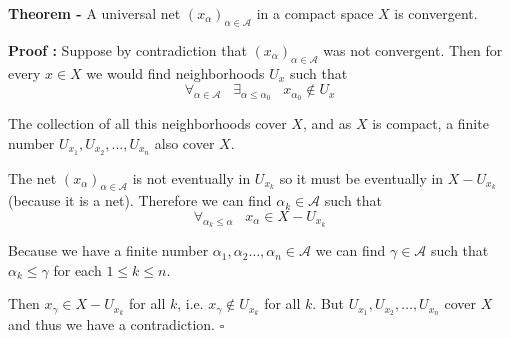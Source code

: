 \documentclass[12pt]{article}
\begin{document}
{\bf Theorem -} A universal net $ (x_{\alpha})_{\alpha \in \mathcal{A}}$ in a compact space $ X$ is convergent.

{\bf Proof :} Suppose by contradiction that $(x_{\alpha})_{\alpha \in \mathcal{A}}$ was not convergent. Then for every $x \in X$ we would find neighborhoods $U_x$ such that
\[
\forall_{\alpha \in \mathcal{A}}\;\;\; \exists_{\alpha \leq \alpha_0} \;\;\; x_{\alpha_0} \notin U_x
\]

The collection of all this neighborhoods cover $X$, and as $X$ is compact, a finite number
$U_{x_1}, U_{x_2}, \dots, U_{x_n}$ also cover $X$.

The net $(x_{\alpha})_{\alpha \in \mathcal{A}}$ is not eventually in $U_{x_k}$ so it must be eventually in $X-U_{x_k}$ (because it is a  net). Therefore we can find $\alpha_k \in \mathcal{A}$ such that
\[ \forall_{\alpha_k \leq \alpha} \;\;\; x_{\alpha} \in X-U_{x_k} \]

Because we have a finite number $\alpha_1, \alpha_2 \dots, \alpha_n \in \mathcal{A}$ we can find $\gamma \in \mathcal{A}$ such that $\alpha_k \leq \gamma$ for each $1 \leq k \leq n$. 

Then $x_{\gamma} \in X-U_{x_k}$ for all $k$, i.e. $x_{\gamma} \notin U_{x_k}$ for all $k$. But $U_{x_1}, U_{x_2}, \dots, U_{x_n}$ cover $X$ and thus we have a contradiction. $\square$
\end{document}

